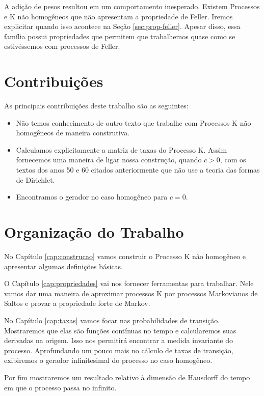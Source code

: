 A adição de pesos resultou em um comportamento inesperado. Existem
Processos e K não homogêneos que não apresentam a propriedade de
Feller.  Iremos explicitar quando isso acontece na Seção
\ref{sec:prop-feller}.  Apesar disso, essa família possui propriedades
que permitem que trabalhemos quase como se estivéssemos com processos
de Feller.

\section{Contribuições}
\label{sec:contribucoes}

As principais contribuições deste trabalho são as seguintes:

\begin{itemize}

\item Não temos conhecimento de outro texto que trabalhe com Processos
  K não homogêneos de maneira construtiva.

\item Calculamos explicitamente a matriz de taxas do Processo K. Assim
  fornecemos uma maneira de ligar nossa construção, quando $c > 0$, com
  os textos dos anos 50 e 60 citados anteriormente que não use a
  teoria das formas de Dirichlet.

\item Encontramos o gerador no caso homogêneo para $c = 0$.

\end{itemize}

\section{Organização do Trabalho}
\label{sec:organizacao_trabalho}

No Capítulo \ref{cap:construcao} vamos construir o Processo K não
homogêneo e apresentar algumas definições básicas.

O Capítulo \ref{cap:propriedades} vai nos fornecer ferramentas para
trabalhar. Nele vamos dar uma maneira de aproximar processos K por
processos Markovianos de Saltos e provar a propriedade forte de
Markov.

No Capítulo \ref{cap:taxas} vamos focar nas probabilidades de
transição. Mostraremos que elas são funções contínuas no tempo e
calcularemos suas derivadas na origem. Isso nos permitirá encontrar a
medida invariante do processo.  Aprofundando um pouco mais no cálculo
de taxas de transição, exibiremos o gerador infinitesimal do processo
no caso homogêneo.

Por fim mostraremos um resultado relativo à dimensão de Hausdorff do
tempo em que o processo passa no infinito.


